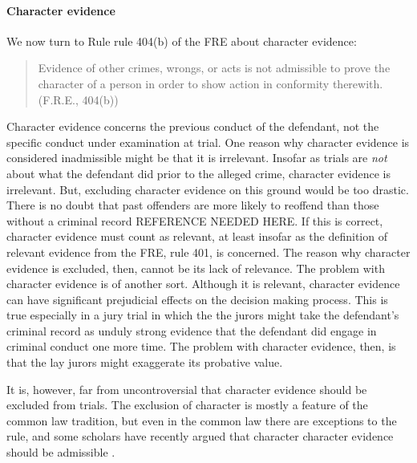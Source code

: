 \documentclass[10pt]{article}
\begin{document}
\paragraph{Character evidence}

We now turn to Rule rule 404(b) of the FRE about character evidence:
%
\begin{quote}
\begin{singlespace}
Evidence of other crimes, wrongs, or acts is not admissible to prove 
the character of a person in order to show action in conformity therewith.
(F.R.E., 404(b))
\end{singlespace}
\end{quote}
%
Character evidence concerns the previous conduct of the defendant, not the specific conduct 
under examination at trial. One reason why character evidence is considered inadmissible might be  
that it is irrelevant. Insofar as trials are \textit{not} about what the defendant did prior to the alleged crime, character evidence is irrelevant. But, excluding character 
evidence on this ground would be too drastic. There is no doubt that past offenders are more likely to reoffend than those without a criminal record REFERENCE NEEDED HERE. If this is correct, 
character evidence must count as relevant, at least insofar as the definition of relevant evidence from the FRE, rule 401, is concerned. The reason why character evidence is excluded, then, cannot be its lack of relevance. The problem with character evidence is of another sort. Although it is relevant, character evidence can have significant 
prejudicial effects on the decision making process. This is true especially in a jury trial in which the the jurors might take 
the defendant's criminal record as unduly strong evidence that the defendant did engage in criminal conduct one more time. The problem with character 
evidence, then, is that the lay jurors might exaggerate its probative value. 

It is, however, far from uncontroversial that character evidence should be excluded from trials. The exclusion of character 
is mostly a feature of the common law tradition, but even in the common law there are exceptions to the rule, %
and some scholars have recently argued that character character evidence should be admissible \citep{redmayne02}.
\end{document}
